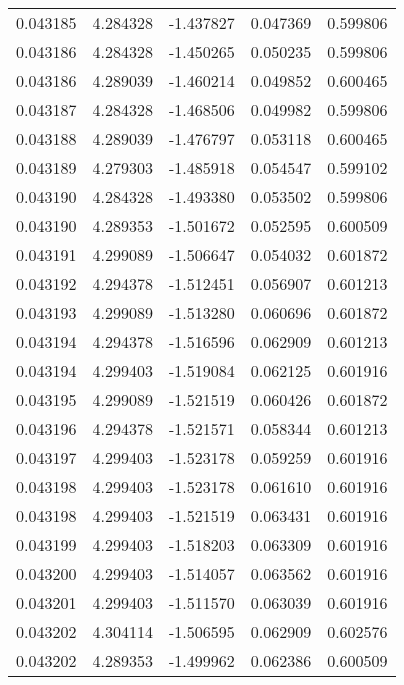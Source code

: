 \begin{tabular}{lrrrr}
0.043185    &  4.284328 & -1.437827 &  0.047369 &             0.599806 \\
0.043186    &  4.284328 & -1.450265 &  0.050235 &             0.599806 \\
0.043186    &  4.289039 & -1.460214 &  0.049852 &             0.600465 \\
0.043187    &  4.284328 & -1.468506 &  0.049982 &             0.599806 \\
0.043188    &  4.289039 & -1.476797 &  0.053118 &             0.600465 \\
0.043189    &  4.279303 & -1.485918 &  0.054547 &             0.599102 \\
0.043190    &  4.284328 & -1.493380 &  0.053502 &             0.599806 \\
0.043190    &  4.289353 & -1.501672 &  0.052595 &             0.600509 \\
0.043191    &  4.299089 & -1.506647 &  0.054032 &             0.601872 \\
0.043192    &  4.294378 & -1.512451 &  0.056907 &             0.601213 \\
0.043193    &  4.299089 & -1.513280 &  0.060696 &             0.601872 \\
0.043194    &  4.294378 & -1.516596 &  0.062909 &             0.601213 \\
0.043194    &  4.299403 & -1.519084 &  0.062125 &             0.601916 \\
0.043195    &  4.299089 & -1.521519 &  0.060426 &             0.601872 \\
0.043196    &  4.294378 & -1.521571 &  0.058344 &             0.601213 \\
0.043197    &  4.299403 & -1.523178 &  0.059259 &             0.601916 \\
0.043198    &  4.299403 & -1.523178 &  0.061610 &             0.601916 \\
0.043198    &  4.299403 & -1.521519 &  0.063431 &             0.601916 \\
0.043199    &  4.299403 & -1.518203 &  0.063309 &             0.601916 \\
0.043200    &  4.299403 & -1.514057 &  0.063562 &             0.601916 \\
0.043201    &  4.299403 & -1.511570 &  0.063039 &             0.601916 \\
0.043202    &  4.304114 & -1.506595 &  0.062909 &             0.602576 \\
0.043202    &  4.289353 & -1.499962 &  0.062386 &             0.600509 \\

\end{tabular}
